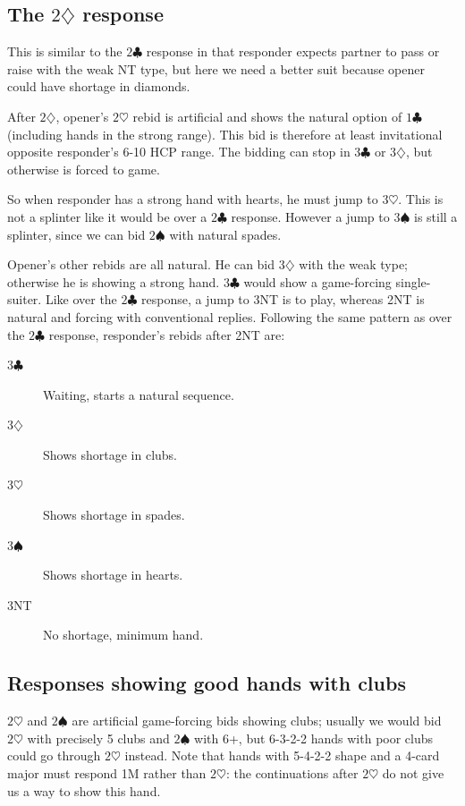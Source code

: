\documentclass{article}
\newcommand{\sz}{\spadesuit}
\newcommand{\hz}{\heartsuit}
\newcommand{\dz}{\diamondsuit}
\newcommand{\cz}{\clubsuit}
\begin{document}
\subsection{The $2\dz$ response}

This is similar to the $2\cz$ response in that responder expects partner to pass or raise with the weak NT type, but here we need a better suit because opener could have shortage in diamonds.

After $2\dz$, opener's $2\hz$ rebid is artificial and shows the natural option of $1\cz$ (including hands in the strong range). This bid is therefore at least invitational opposite responder's 6-10 HCP range. The bidding can stop in $3\cz$ or $3\dz$, but otherwise is forced to game.

So when responder has a strong hand with hearts, he must jump to $3\hz$. This is not a splinter like it would be over a $2\cz$ response. However a jump to $3\sz$ is still a splinter, since we can bid $2\sz$ with natural spades.

Opener's other rebids are all natural.  He can bid $3\dz$ with the weak type; otherwise he is showing a strong hand. $3\cz$ would show a game-forcing single-suiter. Like over the $2\cz$ response, a jump to 3NT is to play, whereas 2NT is natural and forcing with conventional replies. Following the same pattern as over the $2\cz$ response, responder's rebids after 2NT are:
\begin{description}
\item[3$\cz$] Waiting, starts a natural sequence.
\item[3$\dz$] Shows shortage in clubs.
\item[3$\hz$] Shows shortage in spades.
\item[3$\sz$] Shows shortage in hearts.
\item[3NT] No shortage, minimum hand.
\end{description}

\subsection{Responses showing good hands with clubs}

$2\hz$ and $2\sz$ are artificial game-forcing bids showing clubs; usually we would bid $2\hz$ with precisely 5 clubs and $2\sz$ with 6+, but 6-3-2-2 hands with poor clubs could go through $2\hz$ instead. Note that hands with 5-4-2-2 shape and a 4-card major must respond 1M rather than $2\hz$: the continuations after $2\hz$ do not give us a way to show this hand.
\end{document}

